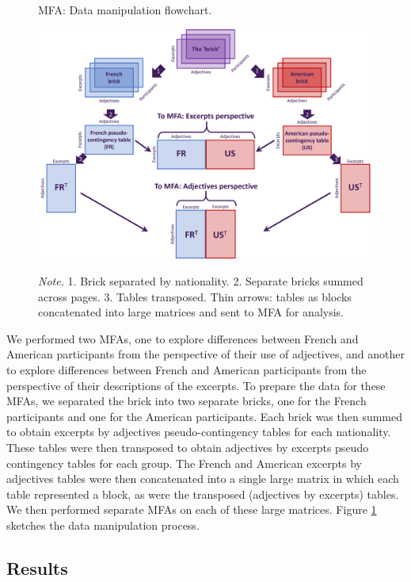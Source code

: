 \documentclass[
  english,
  man]{apa6}
\begin{document}
\begin{figure}   
  \centering  
  \caption{MFA: Data manipulation flowchart.}
    \includegraphics[width=1\columnwidth]{./Music-Descriptor-Space_files/figure-latex/mfadataflow.png}
  \label{fig:mfadataflow}
  \caption*{\footnotesize \textit{Note.} 1. Brick separated by nationality. 2. Separate bricks summed across pages. 3. Tables transposed. Thin arrows: tables as blocks concatenated into large matrices and sent to MFA for analysis.}
\end{figure}

We performed two MFAs, one to explore differences between French and American participants from the perspective of their use of adjectives, and another to explore differences between French and American participants from the perspective of their descriptions of the excerpts. To prepare the data for these MFAs, we separated the brick into two separate bricks, one for the French participants and one for the American participants. Each brick was then summed to obtain excerpts by adjectives pseudo-contingency tables for each nationality. These tables were then transposed to obtain adjectives by excerpts pseudo contingency tables for each group. The French and American excerpts by adjectives tables were then concatenated into a single large matrix in which each table represented a block, as were the transposed (adjectives by excerpts) tables. We then performed separate MFAs on each of these large matrices. Figure \ref{fig:mfadataflow} sketches the data manipulation process.

\hypertarget{results-1}{%
\subsection{Results}\label{results-1}}
\end{document}
